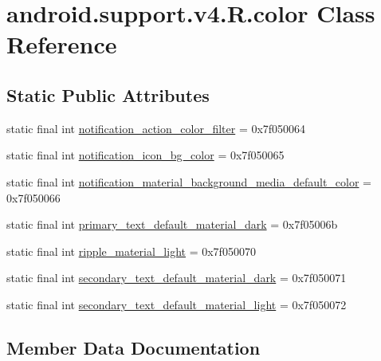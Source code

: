 \hypertarget{classandroid_1_1support_1_1v4_1_1R_1_1color}{}\section{android.\+support.\+v4.\+R.\+color Class Reference}
\label{classandroid_1_1support_1_1v4_1_1R_1_1color}
\subsection*{Static Public Attributes}
\begin{DoxyCompactItemize}
\item 
static final int \mbox{\hyperlink{classandroid_1_1support_1_1v4_1_1R_1_1color_a0e6bd1dee1ba3fbdaf9466f8716e4724}{notification\+\_\+action\+\_\+color\+\_\+filter}} = 0x7f050064
\item 
static final int \mbox{\hyperlink{classandroid_1_1support_1_1v4_1_1R_1_1color_ab31163590b2202e9c99716a3eee564da}{notification\+\_\+icon\+\_\+bg\+\_\+color}} = 0x7f050065
\item 
static final int \mbox{\hyperlink{classandroid_1_1support_1_1v4_1_1R_1_1color_a5e6f79ec370cb9b2e6dc5493bba175df}{notification\+\_\+material\+\_\+background\+\_\+media\+\_\+default\+\_\+color}} = 0x7f050066
\item 
static final int \mbox{\hyperlink{classandroid_1_1support_1_1v4_1_1R_1_1color_ab6983fecb0a5d2f6bfc32106c5eeb217}{primary\+\_\+text\+\_\+default\+\_\+material\+\_\+dark}} = 0x7f05006b
\item 
static final int \mbox{\hyperlink{classandroid_1_1support_1_1v4_1_1R_1_1color_a6fcf1c0f464f5ab3338b9c81e4adac49}{ripple\+\_\+material\+\_\+light}} = 0x7f050070
\item 
static final int \mbox{\hyperlink{classandroid_1_1support_1_1v4_1_1R_1_1color_af44009899b1c7f45700c05018473df2a}{secondary\+\_\+text\+\_\+default\+\_\+material\+\_\+dark}} = 0x7f050071
\item 
static final int \mbox{\hyperlink{classandroid_1_1support_1_1v4_1_1R_1_1color_a3cc6c4f9f00257e09e9f62fbbcef9823}{secondary\+\_\+text\+\_\+default\+\_\+material\+\_\+light}} = 0x7f050072
\end{DoxyCompactItemize}


\subsection{Member Data Documentation}
\mbox{\label{classandroid_1_1support_1_1v4_1_1R_1_1color_a0e6bd1dee1ba3fbdaf9466f8716e4724}} 
